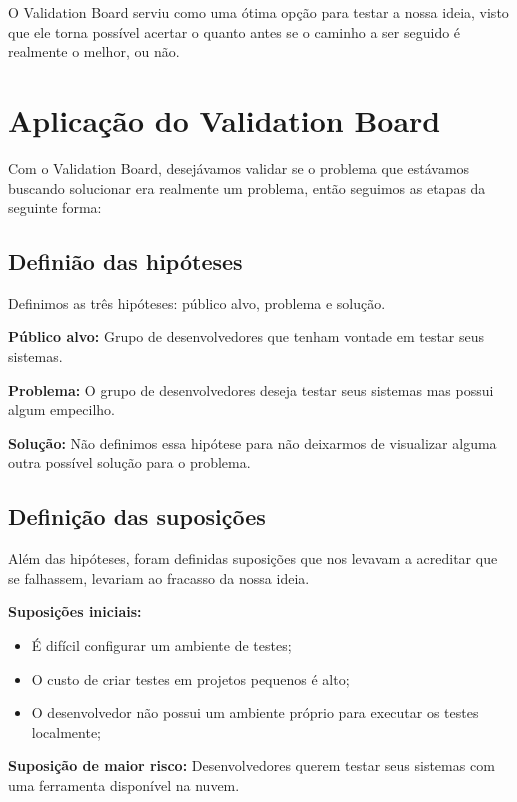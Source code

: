 O Validation Board serviu como uma ótima opção para testar a nossa ideia, visto que ele torna possível acertar o quanto antes se o caminho a ser seguido é realmente o melhor, ou não.

\section{Aplicação do Validation Board}\label{sec:LABEL_CHP_2_SEC_B}

Com o Validation Board, desejávamos validar se o problema que estávamos buscando solucionar era realmente um problema, então seguimos as etapas da seguinte forma:

\subsection{Definião das hipóteses}
Definimos as três hipóteses: público alvo, problema e solução.

\textbf {Público alvo:} Grupo de desenvolvedores que tenham vontade em testar seus sistemas.

\textbf {Problema:} O grupo de desenvolvedores deseja testar seus sistemas mas possui algum empecilho.

\textbf{Solução:} Não definimos essa hipótese para não deixarmos de visualizar alguma outra possível solução para o problema.

\subsection{Definição das suposições}

Além das hipóteses, foram definidas suposições que nos levavam a acreditar que se falhassem, levariam ao fracasso da nossa ideia.

\textbf{Suposições iniciais:}
\begin{itemize}
\item É difícil configurar um ambiente de testes;
\item O custo de criar testes em projetos pequenos é alto;
\item O desenvolvedor não possui um ambiente próprio para executar os testes localmente;
\end{itemize}

\textbf{Suposição de maior risco:}
Desenvolvedores querem testar seus sistemas com uma ferramenta disponível na nuvem.

